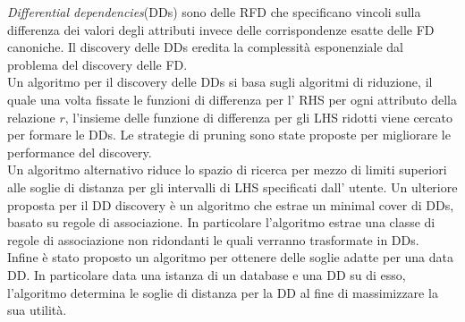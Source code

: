 \textit{Differential dependencies}(DDs) sono delle RFD che specificano vincoli sulla differenza dei valori degli attributi invece delle corrispondenze esatte delle FD canoniche. Il discovery delle DDs eredita la complessità esponenziale dal problema del discovery delle FD.\\ Un algoritmo per il discovery delle DDs si basa sugli algoritmi di riduzione, il quale una volta fissate le funzioni di differenza per l' RHS  per ogni attributo della relazione $r$, l'insieme delle funzione di differenza per gli LHS ridotti viene cercato per formare le DDs. Le strategie di pruning sono state proposte per migliorare le performance del discovery.\\ Un algoritmo alternativo riduce lo spazio di ricerca per mezzo di limiti superiori alle soglie di distanza per gli intervalli di LHS specificati dall' utente. Un ulteriore proposta per il DD discovery è un algoritmo che estrae un minimal cover di DDs, basato su regole di associazione. In particolare l'algoritmo estrae una classe di regole di associazione non ridondanti le quali verranno trasformate in DDs.\\ Infine è stato proposto un algoritmo per ottenere delle soglie adatte per una data DD. In particolare data una istanza di un database e una DD su di esso, l'algoritmo determina le soglie di distanza per la DD al fine di massimizzare la sua utilità. 